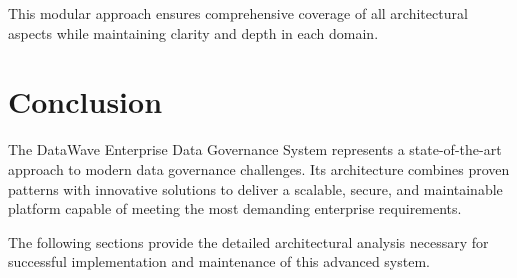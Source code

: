 \documentclass[12pt,a4paper]{article}
\begin{document}
This modular approach ensures comprehensive coverage of all architectural aspects while maintaining clarity and depth in each domain.

\section{Conclusion}

The DataWave Enterprise Data Governance System represents a state-of-the-art approach to modern data governance challenges. Its architecture combines proven patterns with innovative solutions to deliver a scalable, secure, and maintainable platform capable of meeting the most demanding enterprise requirements.

The following sections provide the detailed architectural analysis necessary for successful implementation and maintenance of this advanced system.
\end{document}
